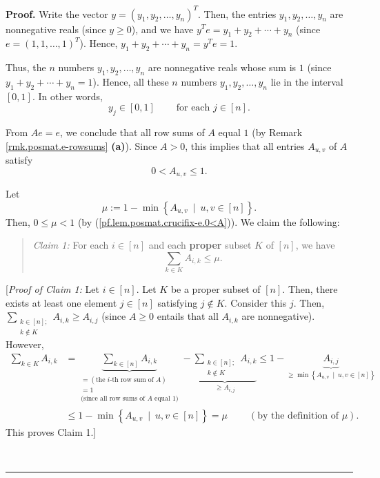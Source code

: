 \documentclass[numbers=enddot,12pt,final,onecolumn,notitlepage]{scrartcl}%
\numberwithin{exer}{subsection}
\theoremstyle{definition}
\newenvironment{statement}{\begin{quote}}{\end{quote}}
\newenvironment{proof}[1][Proof]{\noindent\textbf{#1.} }{\ \rule{0.5em}{0.5em}}
\let\sumnonlimits\sum
\renewcommand{\sum}{\sumnonlimits\limits}
\begin{document}
\begin{proof}
Write the vector $y=\left(  y_{1},y_{2},\ldots,y_{n}\right)  ^{T}$. Then, the
entries $y_{1},y_{2},\ldots,y_{n}$ are nonnegative reals (since $y\geq0$), and
we have $y^{T}e=y_{1}+y_{2}+\cdots+y_{n}$ (since $e=\left(  1,1,\ldots
,1\right)  ^{T}$). Hence, $y_{1}+y_{2}+\cdots+y_{n}=y^{T}e=1$.

Thus, the $n$ numbers $y_{1},y_{2},\ldots,y_{n}$ are nonnegative reals whose
sum is $1$ (since $y_{1}+y_{2}+\cdots+y_{n}=1$). Hence, all these $n$ numbers
$y_{1},y_{2},\ldots,y_{n}$ lie in the interval $\left[  0,1\right]  $. In
other words,%
\begin{equation}
y_{j}\in\left[  0,1\right]  \ \ \ \ \ \ \ \ \ \ \text{for each }j\in\left[
n\right]  . \label{pf.lem.posmat.crucifix-e.yj-in}%
\end{equation}


From $Ae=e$, we conclude that all row sums of $A$ equal $1$ (by Remark
\ref{rmk.posmat.e-rowsums} \textbf{(a)}). Since $A>0$, this implies that all
entries $A_{u,v}$ of $A$ satisfy%
\begin{equation}
0<A_{u,v}\leq1. \label{pf.lem.posmat.crucifix-e.0<A}%
\end{equation}


Let
\[
\mu:=1-\min\left\{  A_{u,v}\ \mid\ u,v\in\left[  n\right]  \right\}  .
\]
Then, $0\leq\mu<1$ (by (\ref{pf.lem.posmat.crucifix-e.0<A})). We claim the following:

\begin{statement}
\textit{Claim 1:} For each $i\in\left[  n\right]  $ and each \textbf{proper}
subset $K$ of $\left[  n\right]  $, we have%
\[
\sum_{k\in K}A_{i,k}\leq\mu.
\]

\end{statement}

[\textit{Proof of Claim 1:} Let $i\in\left[  n\right]  $. Let $K$ be a proper
subset of $\left[  n\right]  $. Then, there exists at least one element
$j\in\left[  n\right]  $ satisfying $j\notin K$. Consider this $j$. Then,
$\sum_{\substack{k\in\left[  n\right]  ;\\k\notin K}}A_{i,k}\geq A_{i,j}$
(since $A\geq0$ entails that all $A_{i,k}$ are nonnegative). However,%
\begin{align*}
\sum_{k\in K}A_{i,k} &  =\underbrace{\sum_{k\in\left[  n\right]  }A_{i,k}%
}_{\substack{=\left(  \text{the }i\text{-th row sum of }A\right)
\\=1\\\text{(since all row sums of }A\text{ equal }1\text{)}}%
}-\underbrace{\sum_{\substack{k\in\left[  n\right]  ;\\k\notin K}}A_{i,k}%
}_{\geq A_{i,j}}\leq1-\underbrace{A_{i,j}}_{\geq\min\left\{  A_{u,v}%
\ \mid\ u,v\in\left[  n\right]  \right\}  }\\
&  \leq1-\min\left\{  A_{u,v}\ \mid\ u,v\in\left[  n\right]  \right\}
=\mu\ \ \ \ \ \ \ \ \ \ \left(  \text{by the definition of }\mu\right)  .
\end{align*}
This proves Claim 1.] \medskip


\end{proof}
\end{document}
